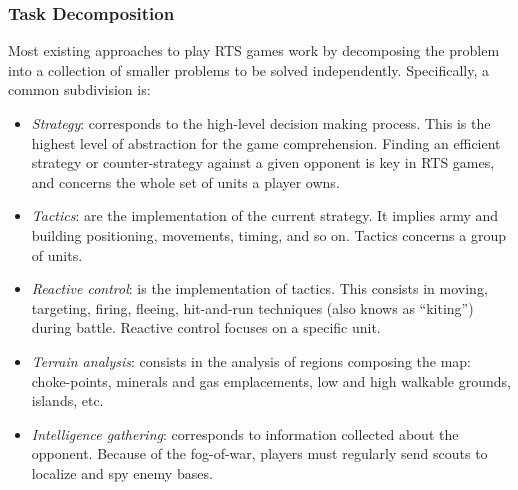 \documentclass{llncs}
\begin{document}
\subsubsection*{Task Decomposition}
Most existing approaches  to play RTS games work by decomposing the  problem into   a    collection   of    smaller   problems to    be   solved
independently. Specifically, a common subdivision is:
\begin{itemize}
\item {\em  Strategy}: corresponds  to the high-level  decision making
  process.  This is  the highest  level  of abstraction  for the  game
  comprehension.  Finding an  efficient  strategy or  counter-strategy
  against a given opponent is key in RTS games, and concerns the whole
  set of units a player
  owns. %
\item   {\em  Tactics}:   are  the   implementation  of   the  current
  strategy.  It  implies  army and  building  positioning,  movements,
  timing, and so on. Tactics concerns a group of
  units. %
\item {\em Reactive  control}: is the implementation  of tactics. This
  consists   in  moving,   targeting,  firing,   fleeing,  hit-and-run
  techniques  (also  knows  as  ``kiting'')  during  battle.  Reactive
  control focuses on a specific
  unit. %
%
\item  {\em Terrain  analysis}: consists  in the  analysis of  regions
  composing the map: choke-points,  minerals and gas emplacements, low
  and high walkable grounds, islands, etc.
\item  {\em   Intelligence  gathering}:  corresponds   to  information
  collected  about the  opponent. Because  of the  fog-of-war, players
  must regularly send scouts to localize and spy enemy
  bases.%
\end{itemize}
\end{document}
